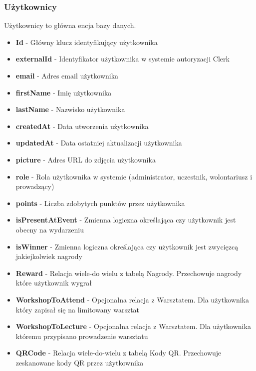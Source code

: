 \subsubsection{Użytkownicy}
\noindent Użytkownicy to główna encja bazy danych.
\begin{itemize}
    \item \textbf{Id} - Główny klucz identyfikujący użytkownika
    \item \textbf{externalId} - Identyfikator użytkownika w systemie autoryzacji Clerk
    \item \textbf{email} - Adres email użytkownika
    \item \textbf{firstName} - Imię użytkownika
    \item \textbf{lastName} - Nazwisko użytkownika
    \item \textbf{createdAt} - Data utworzenia użytkownika
    \item \textbf{updatedAt} - Data ostatniej aktualizacji użytkownika
    \item \textbf{picture} - Adres URL do zdjęcia użytkownika
    \item \textbf{role} - Rola użytkownika w systemie (administrator, uczestnik, wolontariusz i prowadzący)
    \item \textbf{points} - Liczba zdobytych punktów przez użytkownika
    \item \textbf{isPresentAtEvent} - Zmienna logiczna określająca czy użytkownik jest obecny na wydarzeniu
    \item \textbf{isWinner} - Zmienna logiczna określająca czy użytkownik jest zwycięzcą jakiejkolwiek nagrody
    \item  \textbf{Reward} - Relacja wiele-do wielu z tabelą Nagrody. Przechowuje nagrody które użytkownik wygrał
    \item  \textbf{WorkshopToAttend} - Opcjonalna relacja z Warsztatem. Dla użytkownika który zapisał się na limitowany warsztat
    \item  \textbf{WorkshopToLecture} - Opcjonalna relacja z Warsztatem. Dla użytkownika któremu przypisano prowadzenie warsztatu
    \item  \textbf{QRCode} - Relacja wiele-do-wielu z tabelą Kody QR. Przechowuje zeskanowane kody QR przez użytkownika
\end{itemize}

